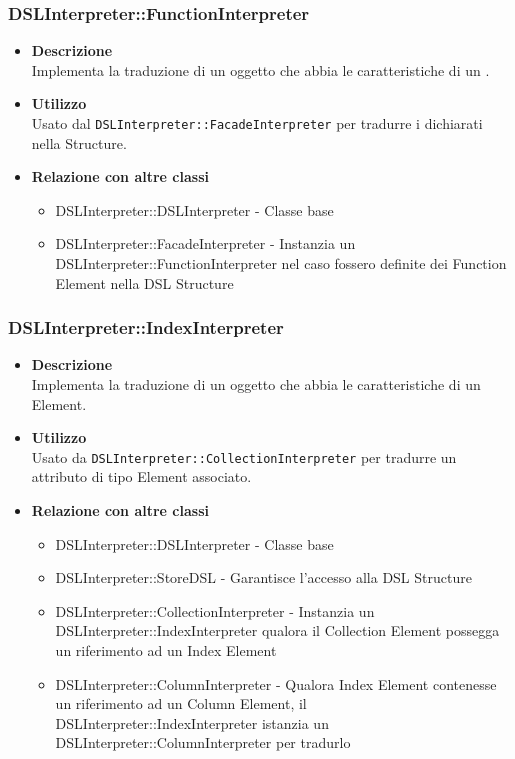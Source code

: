 \subsubsection{DSLInterpreter::FunctionInterpreter}
\begin{itemize}
\item \textbf{Descrizione} \hfill \\
  Implementa la traduzione di un oggetto che abbia le caratteristiche di un .
\item \textbf{Utilizzo} \hfill \\
  Usato dal \texttt{DSLInterpreter::FacadeInterpreter} per tradurre i  dichiarati nella  Structure.
\item \textbf{Relazione con altre classi}
  \begin{itemize}
  \item DSLInterpreter::DSLInterpreter - Classe base
  \item DSLInterpreter::FacadeInterpreter - Instanzia un DSLInterpreter::FunctionInterpreter nel caso fossero definite dei Function Element nella DSL Structure
  \end{itemize}
\end{itemize}

\subsubsection{DSLInterpreter::IndexInterpreter}
\begin{itemize}
\item \textbf{Descrizione} \hfill \\
  Implementa la traduzione di un oggetto che abbia le caratteristiche di un  Element.
\item \textbf{Utilizzo} \hfill \\
  Usato da \texttt{DSLInterpreter::CollectionInterpreter} per tradurre un attributo di tipo  Element associato.
\item \textbf{Relazione con altre classi}
  \begin{itemize}
  \item DSLInterpreter::DSLInterpreter - Classe base
  \item DSLInterpreter::StoreDSL - Garantisce l'accesso alla DSL Structure
  \item DSLInterpreter::CollectionInterpreter - Instanzia un DSLInterpreter::IndexInterpreter qualora il Collection Element possegga un riferimento ad un Index Element
  \item DSLInterpreter::ColumnInterpreter - Qualora Index Element contenesse un riferimento ad un Column Element, il DSLInterpreter::IndexInterpreter istanzia un DSLInterpreter::ColumnInterpreter per tradurlo
  \end{itemize}
\end{itemize}

